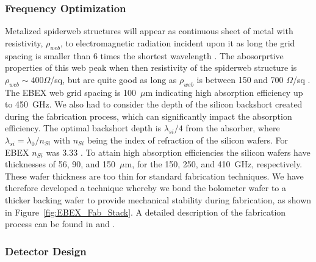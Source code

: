 \documentclass[../EBEXPaper2.tex]{subfiles}
\begin{document}

\subsubsection{Frequency Optimization}
\label{sec:frequency_optimization}

Metalized spiderweb structures will appear as continuous sheet of metal with resistivity, $\rho_{web}$, to electromagnetic radiation incident upon 
it as long the grid spacing is smaller than 6 times the shortest wavelength \citep{GildemeisterSpiderWebs}.
The abosorprtive properties of this web peak when then resistivity of the spiderweb structure is $\rho_{web} \sim 400 \Omega$/sq, 
but are quite good as long as $\rho_{web}$ is between 150 and 700 $\Omega$/sq \citep{glenn_appliedoptics_2002}.
The \ac{EBEX} web grid spacing is 100~$\mu$m indicating high absorption efficiency up to 450~GHz. 
We also had to consider the depth of the silicon backshort created during the fabrication process, which can significantly impact the absorption efficiency.
The optimal backshort depth is $\lambda_{si}/4$ from the absorber, where $\lambda_{si} = \lambda_{0}/n_{Si}$ with $n_{Si}$ being the index of refraction 
of the silicon wafers.  For \ac{EBEX} $n_{Si}$  was 3.33 \citep{GlennFeedHorns}. 
To attain high absorption efficiencies the silicon wafers have thicknesses of 56, 90, and 150~$\mu$m, for the 150, 250, and 410~GHz, respectively. 
These wafer thickness are too thin for standard fabrication techniques. We have therefore developed a technique 
whereby we bond the bolometer wafer to a thicker backing wafer to provide mechanical stability during fabrication, 
as shown in Figure~\ref{fig:EBEX_Fab_Stack}.  A detailed description of the fabrication process can be found in \citet{Westbrook_2012} and \citet{Westbrook_thesis}.


\subsubsection{Detector Design}
\label{sec:design}
\end{document}
